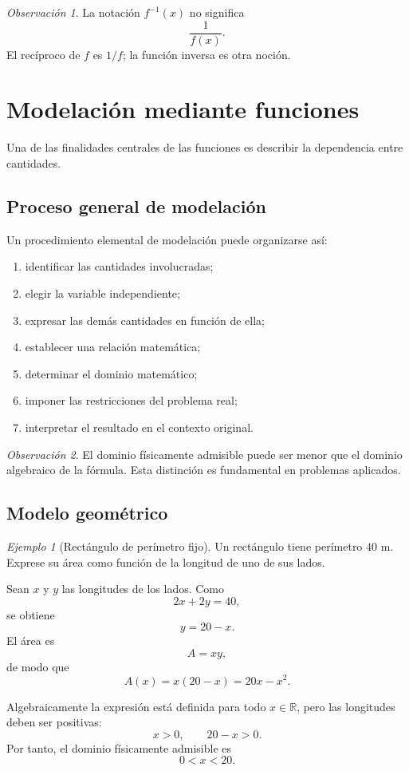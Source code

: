 \documentclass[12pt]{article}
\theoremstyle{remark}
\newtheorem{observacion}{Observación}[section]
\newtheorem{ejemplo}{Ejemplo}[section]
\newcommand{\R}{\mathbb{R}}
\begin{document}
\begin{observacion}
La notación $f^{-1}(x)$ no significa
\[
\frac{1}{f(x)}.
\]
El recíproco de $f$ es $1/f$; la función inversa es otra noción.
\end{observacion}

\section{Modelación mediante funciones}

Una de las finalidades centrales de las funciones es describir la dependencia
entre cantidades.

\subsection*{Proceso general de modelación}

Un procedimiento elemental de modelación puede organizarse así:

\begin{enumerate}
    \item identificar las cantidades involucradas;
    \item elegir la variable independiente;
    \item expresar las demás cantidades en función de ella;
    \item establecer una relación matemática;
    \item determinar el dominio matemático;
    \item imponer las restricciones del problema real;
    \item interpretar el resultado en el contexto original.
\end{enumerate}

\begin{observacion}
El dominio físicamente admisible puede ser menor que el dominio algebraico de
la fórmula. Esta distinción es fundamental en problemas aplicados.
\end{observacion}

\subsection*{Modelo geométrico}

\begin{ejemplo}[Rectángulo de perímetro fijo]
Un rectángulo tiene perímetro $40$ m. Exprese su área como función de la
longitud de uno de sus lados.

Sean $x$ y $y$ las longitudes de los lados. Como
\[
2x+2y=40,
\]
se obtiene
\[
y=20-x.
\]
El área es
\[
A=xy,
\]
de modo que
\[
A(x)=x(20-x)=20x-x^2.
\]

Algebraicamente la expresión está definida para todo $x\in\R$, pero las
longitudes deben ser positivas:
\[
x>0,\qquad20-x>0.
\]
Por tanto, el dominio físicamente admisible es
\[
0<x<20.
\]
\end{ejemplo}
\end{document}

